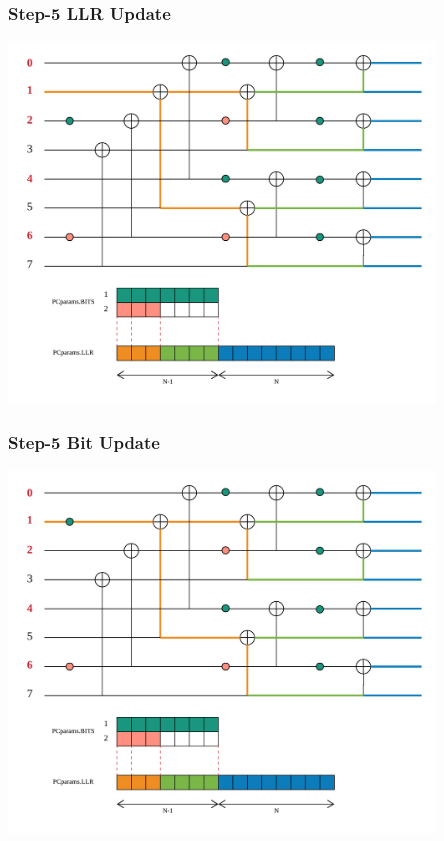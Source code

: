 \documentclass{beamer}
\begin{document}
\begin{frame}
\frametitle{Step-5 LLR Update}
  \begin{center}
  \includegraphics[width=0.85\textwidth]{pics/polar_-_SC_llr_5.png}
  \end{center}
\end{frame}

\begin{frame}
\frametitle{Step-5 Bit Update}
  \begin{center}
  \includegraphics[width=0.85\textwidth]{pics/polar_-_SC_bit_5.png}
  \end{center}
\end{frame}
\end{document}

